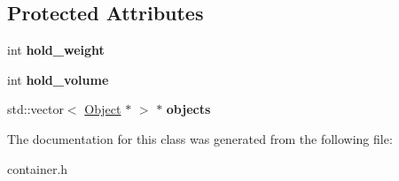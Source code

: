 \subsection*{Protected Attributes}
\begin{DoxyCompactItemize}
\item 
\hypertarget{classda__game_1_1Container_ae00fef93faf3dd5a8535845d0e7f63a0}{
int {\bfseries hold\_\-weight}}
\label{classda__game_1_1Container_ae00fef93faf3dd5a8535845d0e7f63a0}

\item 
\hypertarget{classda__game_1_1Container_aae21247d0254a4e272065b6141795514}{
int {\bfseries hold\_\-volume}}
\label{classda__game_1_1Container_aae21247d0254a4e272065b6141795514}

\item 
\hypertarget{classda__game_1_1Container_ac06cad31bb04667d3fb88c2311422373}{
std::vector$<$ \hyperlink{classda__game_1_1Object}{Object} $\ast$ $>$ $\ast$ {\bfseries objects}}
\label{classda__game_1_1Container_ac06cad31bb04667d3fb88c2311422373}

\end{DoxyCompactItemize}


The documentation for this class was generated from the following file:\begin{DoxyCompactItemize}
\item 
container.h\end{DoxyCompactItemize}
